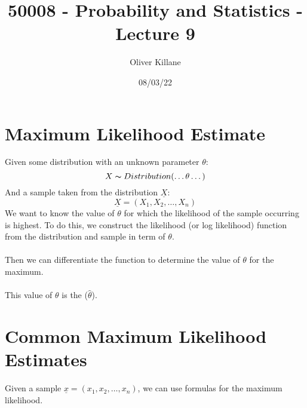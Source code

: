 \documentclass{report}
\title{50008 - Probability and Statistics - Lecture 9}
\author{Oliver Killane}
\date{08/03/22}
\begin{document}
\maketitle
{}
\section*{Maximum Likelihood Estimate}
Given some distribution with an unknown parameter $\theta$:
\[X \thicksim Distribution(\dots \theta \dots)\]
And a sample taken from the distribution $\underline{X}$:
\[\underline{X} = (X_1, X_2, \dots, X_n)\]
We want to know the value of $\theta$ for which the likelihood of the sample occurring is highest.
To do this, we construct the likelihood (or log likelihood) function from the distribution and sample in term of $\theta$.
\\
\\ Then we can differentiate the function to determine the value of $\theta$ for the maximum.
\\
\\ This value of $\theta$ is the  ($\hat{\theta}$).

\section*{Common Maximum Likelihood Estimates}
Given a sample $\underline{x} = (x_1, x_2, \dots, x_n)$, we can use formulas for the maximum likelihood.
\end{document}
